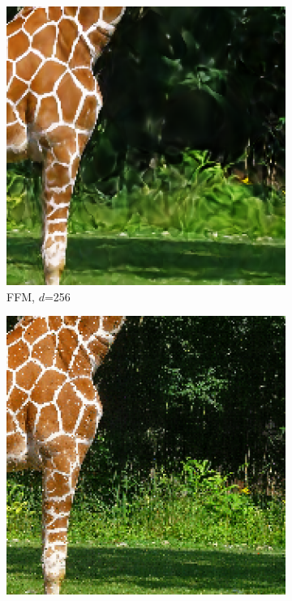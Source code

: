 \begin{figure}[!h]
  
  \begin{subfigure}{.25\textwidth}
  \includegraphics[width=\textwidth]{Bilder/Giraffe/Bildausschnitte/image_result_fourier12000_indim256_lr0.006667.eps}
  \caption{FFM, $d$=256}
  \label{FFM256}
  \end{subfigure}\hfil
  \begin{subfigure}{.25\textwidth}
    \includegraphics[width=\textwidth]{Bilder/Giraffe/Bildausschnitte/image_result_positional12000_indim256_lr0.003333.eps}

\end{subfigure}
\end{figure}
